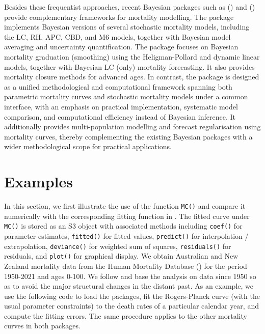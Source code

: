 Besides these frequentist approaches, recent Bayesian packages such as  (\citet{Barigou2023}) and  (\citet{Figueiredo2025}) provide complementary frameworks for mortality modelling. The  package implements Bayesian versions of several stochastic mortality models, including the LC, RH, APC, CBD, and M6 models, together with Bayesian model averaging and uncertainty quantification. The  package focuses on Bayesian mortality graduation (smoothing) using the Heligman-Pollard and dynamic linear models, together with Bayesian LC (only) mortality forecasting. It also provides mortality closure methods for advanced ages. In contrast, the  package is designed as a unified methodological and computational framework spanning both parametric mortality curves and stochastic mortality models under a common interface, with an emphasis on practical implementation, systematic model comparison, and computational efficiency instead of Bayesian inference. It additionally provides multi-population modelling and forecast regularisation using mortality curves, thereby complementing the existing Bayesian packages with a wider methodological scope for practical applications.

\section{Examples}\label{examples}

In this section, we first illustrate the use of the function \texttt{MC()} and compare it numerically with the corresponding fitting function in . The fitted curve under \texttt{MC()} is stored as an S3 object with associated methods including \texttt{coef()} for parameter estimates, \texttt{fitted()} for fitted values, \texttt{predict()} for interpolation / extrapolation, \texttt{deviance()} for weighted sum of squares, \texttt{residuals()} for residuals, and \texttt{plot()} for graphical display. We obtain Australian and New Zealand mortality data from the Human Mortality Database (\citet{HMD2026}) for the period 1950-2021 and ages 0-100. We follow \citet{Lee2001} and base the analysis on data since 1950 so as to avoid the major structural changes in the distant past. As an example, we use the following code to load the packages, fit the Rogers-Planck curve (with the usual parameter constraints) to the death rates of a particular calendar year, and compute the fitting errors. The same procedure applies to the other mortality curves in both packages.

